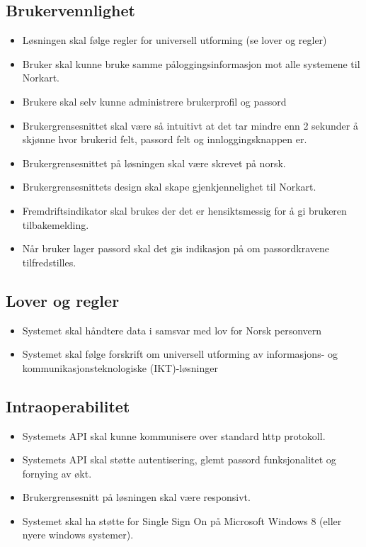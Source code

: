 \subsection{Brukervennlighet}
\label{subsec:kravspesifikasjonGammel_operasjonelleKrav_brukervennlighet}
\begin{itemize}
\item Løsningen skal følge regler for universell utforming (se lover og regler)
\item Bruker skal kunne bruke samme påloggingsinformasjon mot alle systemene til Norkart.
\item Brukere skal selv kunne administrere brukerprofil og passord
\item Brukergrensesnittet skal være så intuitivt at det tar mindre enn 2 sekunder å skjønne hvor brukerid felt, passord felt og innloggingsknappen er.
\item Brukergrensesnittet på løsningen skal være skrevet på norsk.
\item Brukergrensesnittets design skal skape gjenkjennelighet til Norkart.
\item Fremdriftsindikator skal brukes der det er hensiktsmessig for å gi brukeren tilbakemelding.
\item Når bruker lager passord skal det gis indikasjon på om passordkravene tilfredstilles.
\end{itemize}

\subsection{Lover og regler}
\label{subsec:kravspesifikasjonGammel_operasjonelleKrav_lover_regler}
\begin{itemize}
\item Systemet skal håndtere data i samsvar med lov for Norsk personvern
\item Systemet skal følge forskrift om universell utforming av informasjons- og kommunikasjonsteknologiske (IKT)-løsninger
\end{itemize}

\subsection{Intraoperabilitet}
\label{subsec:kravspesifikasjonGammel_operasjonelleKrav_intraoperabilitet}
\begin{itemize}
\item Systemets API skal kunne kommunisere over standard http protokoll.
\item Systemets API skal støtte autentisering, glemt passord funksjonalitet og fornying av økt.
\item Brukergrensesnitt på løsningen skal være responsivt.
\item Systemet skal ha støtte for Single Sign On på Microsoft Windows 8 (eller nyere windows systemer).
\end{itemize}

